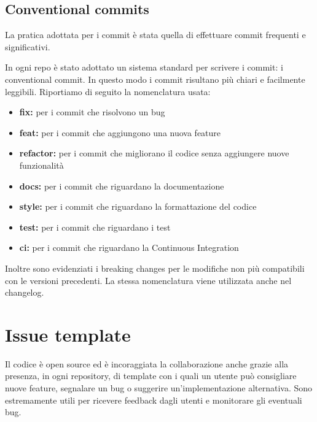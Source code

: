 
\subsection{Conventional commits}
La pratica adottata per i commit è stata quella di effettuare commit frequenti e significativi.

In ogni repo è stato adottato un sistema standard per scrivere i commit:  i conventional commit. In questo modo i commit risultano più chiari e facilmente leggibili. 
Riportiamo di seguito la nomenclatura usata:
\begin{itemize}
    \item \textbf{fix:} per i commit che risolvono un bug
    \item \textbf{feat:} per i commit che aggiungono una nuova feature
    \item \textbf{refactor:} per i commit che migliorano il codice senza aggiungere nuove funzionalità
    \item \textbf{docs:} per i commit che riguardano la documentazione
    \item \textbf{style:} per i commit che riguardano la formattazione del codice
    \item \textbf{test:} per i commit che riguardano i test
    \item \textbf{ci:} per i commit che riguardano la Continuous Integration
\end{itemize}
Inoltre sono evidenziati i breaking changes per le modifiche non più compatibili con le versioni precedenti.
La stessa nomenclatura viene utilizzata anche nel changelog.


\section{Issue template}
Il codice è open source ed è incoraggiata la collaborazione anche grazie alla presenza, in ogni repository, di template con i quali un utente può consigliare nuove feature,
segnalare un bug o suggerire un'implementazione alternativa. Sono estremamente utili per ricevere feedback dagli utenti e monitorare gli eventuali bug.

